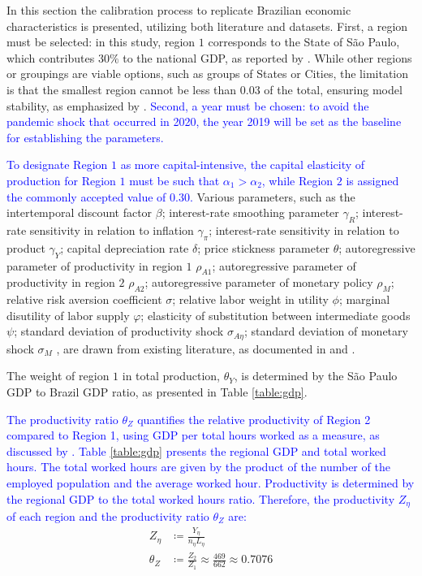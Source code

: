 \documentclass[../thesis.tex]{subfiles}
\begin{document}
In this section the calibration process to replicate Brazilian economic characteristics is presented, utilizing both literature and datasets. First, a region must be selected: in this study, region $1$ corresponds to the State of São Paulo, which contributes $30\%$ to the national GDP, as reported by \textcite{ibge_GDP_2023}. While other regions or groupings are viable options, such as groups of States or Cities, the limitation is that the smallest region cannot be less than $0.03$ of the total, ensuring model stability, as emphasized by \textcite{konopkova_pitfalls_2019}. \textcolor{blue}{Second, a year must be chosen: to avoid the pandemic shock that occurred in 2020, the year 2019 will be set as the baseline for establishing the parameters.}

\textcolor{blue}{To designate Region $1$ as more capital-intensive, the capital elasticity of production for Region $1$ must be such that $\alpha_{1} > \alpha_{2}$, while Region $2$ is assigned the commonly accepted value of $0.30$.} Various parameters, such as the 
intertemporal discount factor $\beta$; 
interest-rate smoothing parameter $\gamma_{R}$; 
interest-rate sensitivity in relation to inflation $\gamma_{\pi}$; 
interest-rate sensitivity in relation to product $\gamma_{Y}$; 
capital depreciation rate $\delta$; 
price stickness parameter $\theta$;
autoregressive parameter of productivity in region $1$ $\rho_{A1}$;
autoregressive parameter of productivity in region $2$ $\rho_{A2}$;
autoregressive parameter of monetary policy $\rho_{M}$;
relative risk aversion coefficient $\sigma$;
relative labor weight in utility $\phi$;
marginal disutility of labor supply $\varphi$;
elasticity of substitution between intermediate goods $\psi$;
standard deviation of productivity shock $\sigma_{A\eta}$;
standard deviation of monetary shock $\sigma_{M}$
, are drawn from existing literature, as documented in \textcite{costa_junior_understanding_2016} and \textcite{pereira_rbc_2021}.

The weight of region $1$ in total production, $\theta_{Y}$, is determined by the São Paulo GDP to Brazil GDP ratio, as presented in Table \eqref{table:gdp}.

\textcolor{blue}{The productivity ratio $\theta_{Z}$ quantifies the relative productivity of Region 2 compared to Region 1, using GDP per total hours worked as a measure, as discussed by \textcite{krugman_defining_1997}. Table \eqref{table:gdp} presents the regional GDP and total worked hours. The total worked hours are given by the product of the number of the employed population and the average worked hour. Productivity is determined by the regional GDP to the total worked hours ratio. Therefore, the productivity $Z_{\eta}$ of each region and the productivity ratio $\theta_{Z}$ are:}
\begin{align}
	Z_{\eta}  &\coloneqq \frac{Y_{\eta}}{n_{\eta} L_{\eta}} \\
	\theta_{Z} &\coloneqq \frac{Z_{2}}{Z_{1}} \approx \frac{469}{662} \approx 0.7076
\end{align}
\end{document}
